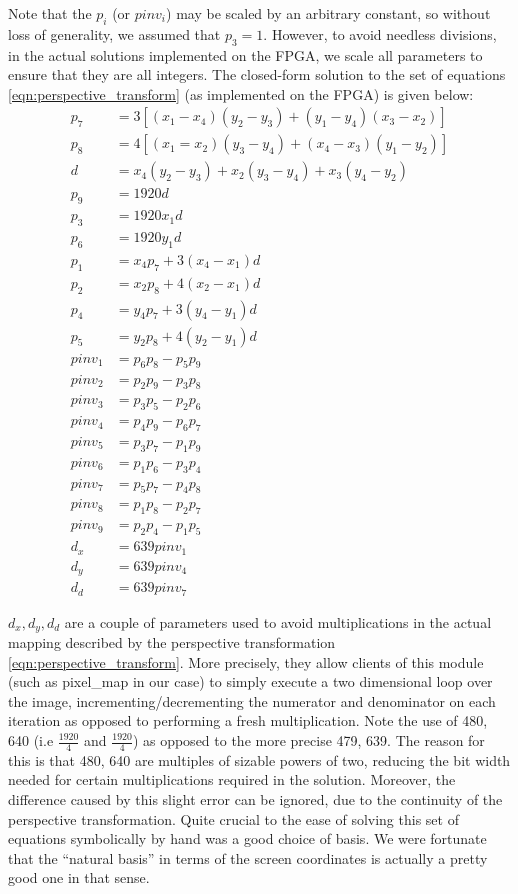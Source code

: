 \documentclass{article}
\begin{document}
Note that the $p_i$ (or $pinv_i$) may be scaled by an arbitrary constant, so without loss of generality, we assumed that $p_3 = 1$.
However, to avoid needless divisions, in the actual solutions implemented on the FPGA,
we scale all parameters to ensure that they are all integers.
The closed-form solution to the set of equations  \eqref{eqn:perspective_transform} (as implemented on the FPGA) is given below:
\begin{align}
    p_7 &= 3[(x_1 - x_4)(y_2 - y_3) + (y_1 - y_4)(x_3 - x_2)] \\
    p_8 &= 4[(x_1 = x_2)(y_3 - y_4) + (x_4 - x_3)(y_1 - y_2)] \\
    d &= x_4(y_2 - y_3) + x_2(y_3 - y_4) + x_3(y_4 - y_2) \\
    p_9 &= 1920 d \\
    p_3 &= 1920 x_1 d \\
    p_6 &= 1920 y_1 d \\
    p_1 &= x_4 p_7 + 3(x_4 - x_1)d \\
    p_2 &= x_2 p_8 + 4(x_2 - x_1)d \\
    p_4 &= y_4 p_7 + 3(y_4 - y_1)d \\
    p_5 &= y_2 p_8 + 4(y_2 - y_1)d \\
    pinv_1 &= p_6 p_8 - p_5 p_9 \\
    pinv_2 &= p_2 p_9 - p_3 p_8 \\
    pinv_3 &= p_3 p_5 - p_2 p_6 \\
    pinv_4 &= p_4 p_9 - p_6 p_7 \\
    pinv_5 &= p_3 p_7 - p_1 p_9 \\
    pinv_6 &= p_1 p_6 - p_3 p_4 \\
    pinv_7 &= p_5 p_7 - p_4 p_8 \\
    pinv_8 &= p_1 p_8 - p_2 p_7 \\
    pinv_9 &= p_2 p_4 - p_1 p_5 \\
    d_x &= 639 pinv_1 \\
    d_y &= 639 pinv_4 \\
    d_d &= 639 pinv_7
\end{align}

$d_x, d_y, d_d$ are a couple of parameters used to avoid multiplications in the actual mapping described by the perspective transformation
\eqref{eqn:perspective_transform}.
More precisely, they allow clients of this module (such as pixel\_map in our case) to simply execute a two dimensional loop over the image,
incrementing/decrementing the numerator and denominator on each iteration as opposed to performing a fresh multiplication.
Note the use of 480, 640 (i.e $\frac{1920}{4}$ and $\frac{1920}{4}$) as opposed to the more precise 479, 639.
The reason for this is that 480, 640 are multiples of sizable powers of two, reducing the bit width needed for certain multiplications required in the solution.
Moreover, the difference caused by this slight error can be ignored, due to the continuity of the perspective transformation.
Quite crucial to the ease of solving this set of equations symbolically by hand was a good choice of basis.
We were fortunate that the ``natural basis'' in terms of the screen coordinates is actually a pretty good one in that sense.
\end{document}
